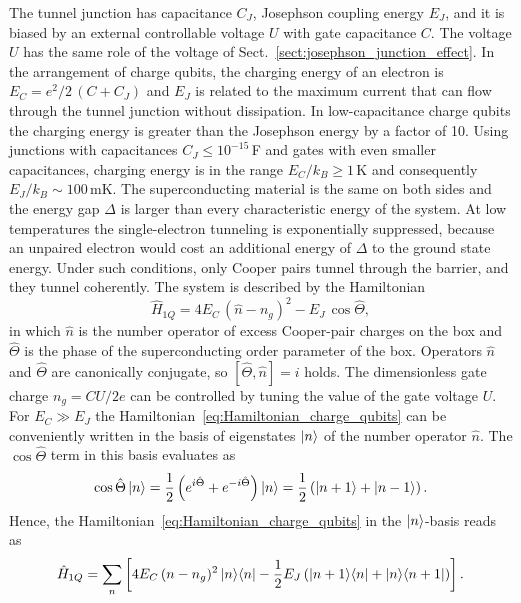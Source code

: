\documentclass[../main/main.tex]{subfiles}
\begin{document}
The tunnel junction has capacitance $C_J$, Josephson coupling energy $E_J$, and it is biased by an external controllable voltage $U$ with gate capacitance $C$. The voltage $U$ has the same role of the voltage of Sect.~\ref{sect:josephson_junction_effect}. In the arrangement of charge qubits, the charging energy of an electron is \mbox{$E_C = e^2/2 \, (C+C_J)$} and $E_J$ is related to the maximum current that can flow through the tunnel junction without dissipation. In low-capacitance charge qubits the charging energy is greater than the Josephson energy by a factor of 10. Using junctions with capacitances $C_J \leq 10^{-15}\,$F and gates with even smaller capacitances, charging energy is in the range $E_C/k_B \geq 1\,$K and consequently $E_J/k_B \sim 100\,$mK. The superconducting material is the same on both sides and the energy gap $\Delta$ is larger than every characteristic energy of the system. At low temperatures the single-electron tunneling is exponentially suppressed, because an unpaired electron would cost an additional energy of $\Delta$ to the ground state energy. Under such conditions, only Cooper pairs tunnel through the barrier, and they tunnel coherently. The system is described by the Hamiltonian \cite{RevModPhys.73.357,benenti_casati_strini_quantum_computation_information}
\begin{equation} \label{eq:Hamiltonian_charge_qubits}
    \hat{H}_{1Q} = 4 E_C\, (\hat{n}-n_g)^2 - E_J\, \cos{\hat{\Theta}},
\end{equation}
in which $\hat{n}$ is the number operator of excess Cooper-pair charges on the box and $\hat{\Theta}$ is the phase of the superconducting order parameter of the box. Operators $\hat{n}$ and $\hat{\Theta}$ are canonically conjugate, so $[\hat{\Theta},\hat{n}]=i$ holds. The dimensionless gate charge $n_g = C U / 2 e$ can be controlled by tuning the value of the gate voltage $U$. For $E_C \gg E_J$ the Hamiltonian~\eqref{eq:Hamiltonian_charge_qubits} can be conveniently written in the basis of eigenstates $\ket{n}$ of the number operator $\hat{n}$. The $\cos{\hat{\Theta}}$ term in this basis evaluates as
\begin{equation} \label{eq:cosTheta_n_basis}
    \cos{\hat{\Theta}} \ket{n} = \frac{1}{2} \left( e^{i \hat{\Theta}} + e^{-i \hat{\Theta}} \right) \ket{n} =  \frac{1}{2} \left( \ket{n+1} + \ket{n-1} \right).
\end{equation}
Hence, the Hamiltonian~\eqref{eq:Hamiltonian_charge_qubits} in the $\ket{n}$-basis reads as
\begin{equation} \label{eq:Hamiltonian_charge_qubits_ket_n_basis}
    \hat{H}_{1Q} = \sum_n \left[ 4 E_C\, (n-n_g)^2 \ket{n}\!\bra{n} - \frac{1}{2} E_J \left( \ket{n+1}\!\bra{n} + \ket{n}\!\bra{n+1} \right) \right].
\end{equation}
\end{document}
